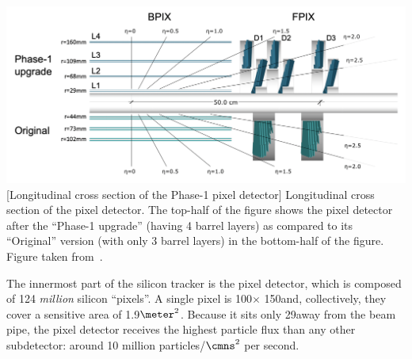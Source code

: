 \begin{multiFigure}
    \centering
        \includegraphics[width=\textwidth]{figures/cms/tracker/pixel_barrel_upgrade.png}
        [Longitudinal cross section of the Phase-1 pixel detector]
        {Longitudinal cross section of the pixel detector.
        The top-half of the figure shows the pixel detector after the ``Phase-1 upgrade'' (\eg having 4 barrel layers) as compared to its ``Original'' version (with only 3 barrel layers) in the bottom-half of the figure.
        Figure taken from~\cite{pixel_phase1}.}
    \label{fig:pixel_xs_long}
\end{multiFigure}

The innermost part of the silicon tracker is the pixel detector, which is composed of 124 \emph{million} silicon ``pixels''.
A single pixel is 100\mum $\times$ 150\mum and, collectively, they cover a sensitive area of 1.9$\meter^2$.
Because it sits only 29\mm away from the beam pipe, the pixel detector receives the highest particle flux than any other subdetector:
around 10 million particles/$\cmns^2$ per second.

